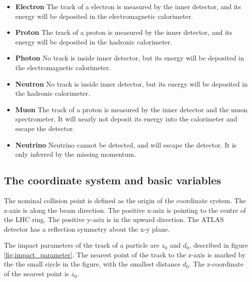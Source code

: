 \begin{itemize}
\item \textbf{Electron} The track of a electron is measured by the inner detector, and its energy will be deposited in the electromagnetic calorimeter.
\item \textbf{Proton} The track of a proton is measured by the inner detector, and its energy will be deposited in the hadronic calorimeter.
\item \textbf{Photon} No track is inside inner detector, but its energy will be deposited in the electromagnetic calorimeter.
\item \textbf{Neutron} No track is inside inner detector, but its energy will be deposited in the hadronic calorimeter.
\item \textbf{Muon} The track of a proton is measured by the inner detector and the muon spectrometer. It will nearly not deposit its energy into the calorimeter and escape the detector.
\item \textbf{Neutrino} Neutrino cannot be detected, and will escape the detector. It is only inferred by the missing momentum.
\end{itemize}

\subsection{The coordinate system and basic variables}
The nominal collision point is defined as the origin of the coordinate system.
The z-axis is along the beam direction.
The positive x-asix is pointing to the centre of the LHC ring.
The positive y-asix is in the upward direction.
The ATLAS detector has a reflection symmetry about the x-y plane.

The impact parameters of the track of a particle are $z_0$ and $d_0$, described in figure \ref{fig:impact_parameter}.
The nearest point of the track to the z-axis is marked by the the small circle in the figure, with the smallest distance $d_0$.
The z-coordinate of the nearest point is $z_0$.

